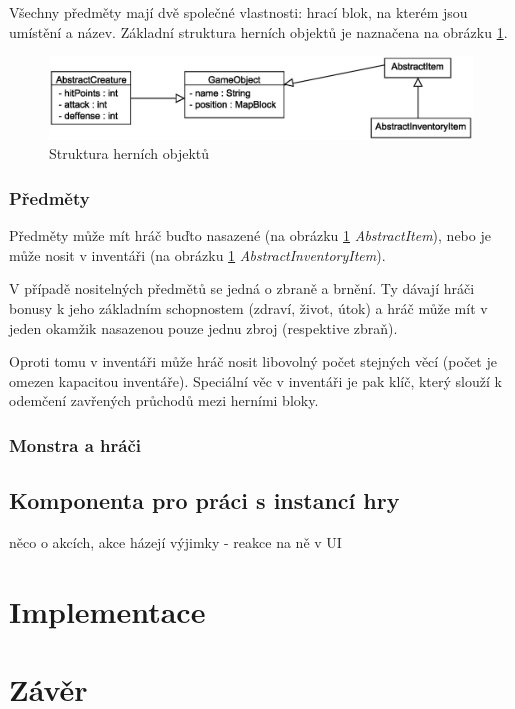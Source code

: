 \documentclass[11pt,a4paper]{scrartcl}
\begin{document}
	Všechny předměty mají dvě společné vlastnosti: hrací blok, na kterém jsou umístění a název. Základní struktura herních objektů je naznačena na obrázku \ref{fig:game-obj}. 
	
	\begin{figure}[H]
		\includegraphics[width=140mm]{core-game-objects-simple}
		\caption{Struktura herních objektů}
		\label{fig:game-obj}
	\end{figure}
	
	\subsubsection{Předměty}
	Předměty může mít hráč buďto nasazené (na obrázku \ref{fig:game-obj} \textit{AbstractItem}), nebo je může nosit v inventáři (na obrázku \ref{fig:game-obj} \textit{AbstractInventoryItem}). 
	
	V případě nositelných předmětů se jedná o zbraně a brnění. Ty dávají hráči bonusy k jeho základním schopnostem (zdraví, život, útok) a hráč může mít v jeden okamžik nasazenou pouze jednu zbroj (respektive zbraň).
	
	Oproti tomu v inventáři může hráč nosit libovolný počet stejných věcí (počet je omezen kapacitou inventáře). Speciální věc v inventáři je pak klíč, který slouží k odemčení zavřených průchodů mezi herními bloky.
	
	\subsubsection{Monstra a hráči}
	
	
	\subsection{Komponenta pro práci s instancí hry}
	
	něco o akcích, akce házejí výjimky - reakce na ně v UI
	
	\section{Implementace}
	
	 
	\section{Závěr}
	
\end{document}
